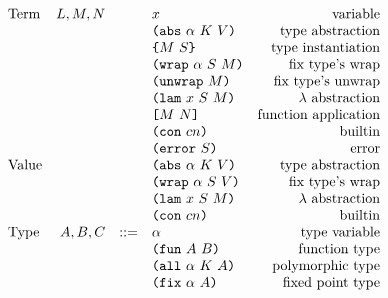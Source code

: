 \documentclass[../main.tex]{subfiles}
\begin{document}
\begin{figure*}[t]
    \centering
    \[\begin{array}{lrclr}
        \textrm{Term}             & L,M,N  &     & x                          & \textrm{variable}\\
                                  &        &     & \texttt{(} \texttt{abs} ~ \alpha ~ K ~ V \texttt{)}         & \textrm{type abstraction}\\
                                  &        &     & \texttt{\{}M ~ S\texttt{\}}                & \textrm{type instantiation}\\
                                  &        &     & \texttt{(} \texttt{wrap} ~ \alpha ~ S ~ M \texttt{)}        & \textrm{fix type's wrap}\\
                                  &        &     & \texttt{(} \texttt{unwrap} ~ M \texttt{)}                 & \textrm{fix type's unwrap}\\
                                  &        &     & \texttt{(} \texttt{lam} ~ x ~ S ~ M \texttt{)}              & \textrm{$\lambda$ abstraction}\\
                                  &        &     & \texttt{[} M ~ N \texttt{]}                 & \textrm{function application}\\
                                  &        &     & \texttt{(} \texttt{con} ~ cn \texttt{)}                   & \textrm{builtin}\\
                                  &        &     & \texttt{(} \texttt{error} ~ S \texttt{)}                  & \textrm{error}\\
        \textrm{Value}            &        &     & \texttt{(} \texttt{abs} ~ \alpha ~ K ~ V \texttt{)}         & \textrm{type abstraction}\\
                                  &        &     & \texttt{(} \texttt{wrap} ~ \alpha ~ S ~ V \texttt{)}        & \textrm{fix type's wrap}\\
                                  &        &     & \texttt{(} \texttt{lam} ~ x ~ S ~ M \texttt{)}              & \textrm{$\lambda$ abstraction}\\
                                  &        &     & \texttt{(} \texttt{con} ~ cn \texttt{)}                   & \textrm{builtin}\\
        \textrm{Type}             & A,B,C  & ::= & \alpha                     & \textrm{type variable}\\
                                  &        &     & \texttt{(} \texttt{fun} ~ A ~ B \texttt{)}                & \textrm{function type}\\
                                  &        &     & \texttt{(} \texttt{all} ~ \alpha ~ K ~ A \texttt{)}        & \textrm{polymorphic type}\\
                                  &        &     & \texttt{(} \texttt{fix} ~ \alpha ~ A \texttt{)}           & \textrm{fixed point type}\\

\end{array}\]
\end{figure*}
\end{document}
